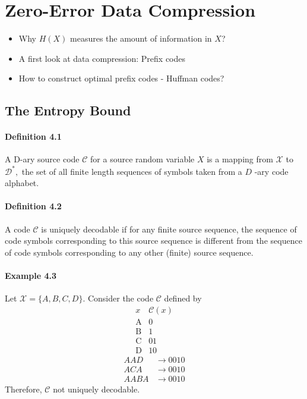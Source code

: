 \documentclass[8pt]{article}
\begin{document}
\newpage
\section{Zero-Error Data Compression}
\begin{itemize}
    \item Why $H(X)$ measures the amount of information in $X$?
    \item A first look at data compression: Prefix codes
    \item How to construct optimal prefix codes - Huffman codes?
\end{itemize}

\subsection{The Entropy Bound}

\paragraph{Definition 4.1} A D-ary source code $\mathcal{C}$ for a source random variable $X$ is a mapping from $\mathcal{X}$ to $\mathcal{D}^{*},$ the set of all finite length sequences of symbols taken from a $D$ -ary code alphabet.

\paragraph{Definition 4.2} $\mathrm{A}$ code $\mathcal{C}$ is uniquely decodable if for any finite source sequence, the sequence of code symbols corresponding to this source sequence is different from the sequence of code symbols corresponding to any other (finite) source sequence.

\paragraph{Example 4.3} Let $\mathcal{X}=\{A, B, C, D\} .$ Consider the code $\mathcal{C}$ defined by
$$
\begin{array}{c|c}
x & \mathcal{C}(x) \\
\hline \mathrm{A} & 0 \\
\mathrm{B} & 1 \\
\mathrm{C} & 01 \\
\mathrm{D} & 10
\end{array}
$$
$$
\begin{array}{ll}
A A D & \rightarrow 0010 \\
A C A & \rightarrow 0010 \\
A A B A & \rightarrow 0010
\end{array}
$$
Therefore, $\mathcal{C}$ not uniquely decodable.
\end{document}
